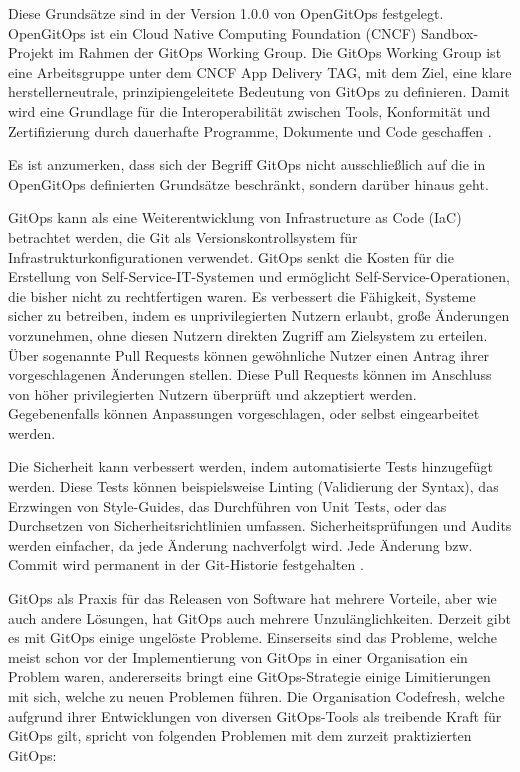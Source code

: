 \noindent
Diese Grundsätze sind in der Version 1.0.0 von OpenGitOps festgelegt.
OpenGitOps ist ein Cloud Native Computing Foundation (CNCF) Sandbox-Projekt im Rahmen der GitOps Working Group.
Die GitOps Working Group ist eine Arbeitsgruppe unter
dem CNCF App Delivery TAG,
mit dem Ziel, eine klare herstellerneutrale,
prinzipiengeleitete Bedeutung von GitOps zu definieren.
Damit wird eine Grundlage für die Interoperabilität zwischen Tools, Konformität und Zertifizierung durch dauerhafte Programme, Dokumente und Code geschaffen
\autocite{opengitopsDocuments}.
\bigskip

\noindent
Es ist anzumerken, dass sich der Begriff GitOps nicht ausschließlich auf
die in OpenGitOps definierten Grundsätze beschränkt,
sondern darüber hinaus geht.
\bigskip

\noindent
GitOps kann als eine Weiterentwicklung von Infrastructure as Code (IaC) betrachtet werden, die Git als Versionskontrollsystem für Infrastrukturkonfigurationen verwendet.
GitOps senkt die Kosten für die Erstellung von Self-Service-IT-Systemen und ermöglicht Self-Service-Operationen, die bisher nicht zu rechtfertigen waren.
Es verbessert die Fähigkeit, Systeme sicher zu betreiben, indem es
unprivilegierten Nutzern erlaubt, große Änderungen vorzunehmen,
ohne diesen Nutzern direkten Zugriff am Zielsystem zu erteilen.
Über sogenannte Pull Requests können gewöhnliche Nutzer einen Antrag
ihrer vorgeschlagenen Änderungen stellen.
Diese Pull Requests können im Anschluss von höher privilegierten Nutzern
überprüft und akzeptiert werden.
Gegebenenfalls können Anpassungen vorgeschlagen, oder selbst eingearbeitet werden.
\bigskip

\noindent
Die Sicherheit kann verbessert werden, indem automatisierte Tests hinzugefügt werden.
Diese Tests können beispielsweise
Linting (Validierung der Syntax),
das Erzwingen von Style-Guides,
das Durchführen von Unit Tests,
oder
das Durchsetzen von Sicherheitsrichtlinien
umfassen.
Sicherheitsprüfungen und Audits werden einfacher, 
da jede Änderung nachverfolgt wird.
Jede Änderung bzw. Commit wird permanent in der Git-Historie festgehalten
\autocite{limoncelli_gitopsPathToMoreSelfService}.
\bigskip


\noindent
GitOps als Praxis für das Releasen von Software hat mehrere Vorteile,
aber wie auch andere Lösungen, hat GitOps auch mehrere Unzulänglichkeiten.
Derzeit gibt es mit GitOps einige ungelöste Probleme.
Einserseits sind das Probleme, welche meist schon 
vor der Implementierung von GitOps in einer Organisation ein Problem waren,
andererseits bringt eine GitOps-Strategie einige Limitierungen mit sich,
welche zu neuen Problemen führen.
Die Organisation Codefresh,
welche aufgrund ihrer Entwicklungen
von diversen GitOps-Tools
als treibende Kraft für GitOps gilt,
spricht von folgenden Problemen mit dem zurzeit praktizierten GitOps:


